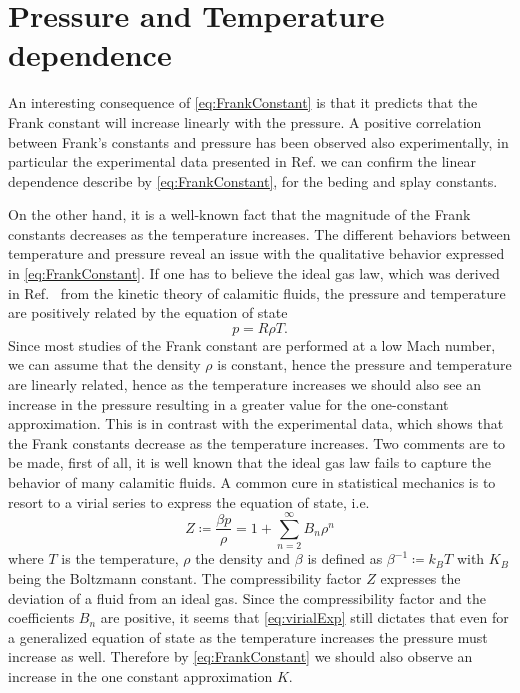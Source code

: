 \documentclass[%
 aip,
 amsmath,amssymb,
 reprint,%
]{revtex4-1}
\begin{document}
\section{Pressure and Temperature dependence}
An interesting consequence of \eqref{eq:FrankConstant} is that it predicts that the Frank constant will increase linearly with the pressure. A positive correlation between Frank's constants and pressure has been observed also experimentally\cite{SBF87}, in particular the experimental data presented in Ref. \cite{PRPH12} we can confirm the linear dependence describe by \eqref{eq:FrankConstant}, for the beding and splay constants.

On the other hand, it is a well-known fact that the magnitude of the Frank constants decreases as the temperature increases\cite{dGJ,G73}.
The different behaviors between temperature and pressure reveal an issue with the qualitative behavior expressed in \eqref{eq:FrankConstant}.
If one has to believe the ideal gas law, which was derived in Ref.~ from the kinetic theory of calamitic fluids, the pressure and temperature are positively related by the equation of state
\begin{equation}
  p = R \rho T. 
\end{equation}
Since most studies of the Frank constant are performed at a low Mach number, we can assume that the density $\rho$ is constant, hence the pressure and temperature are linearly related, hence as the temperature increases we should also see an increase in the pressure resulting in a greater value for the one-constant approximation.
This is in contrast with the experimental data, which shows that the Frank constants decrease as the temperature increases.
Two comments are to be made, first of all, it is well known that the ideal gas law fails to capture the behavior of many calamitic fluids\cite{YV78}. A common cure in statistical mechanics is to resort to a virial series to express the equation of state, i.e.
\begin{equation}
  \label{eq:virialExp}
  Z \coloneqq \frac{\beta p}{\rho} = 1 + \sum_{n=2}^\infty B_n\rho^n
\end{equation}
where $T$ is the temperature, $\rho$ the density and $\beta$ is defined as $\beta^{-1}\coloneq k_B T$ with $K_B$ being the Boltzmann constant.
The compressibility factor $Z$ expresses the deviation of a fluid from an ideal gas.
Since the compressibility factor and the coefficients $B_n$ are positive, it seems that \eqref{eq:virialExp} still dictates that even for a generalized equation of state as the temperature increases the pressure must increase as well. Therefore by \eqref{eq:FrankConstant} we should also observe an increase in the one constant approximation $K$.
\end{document}
